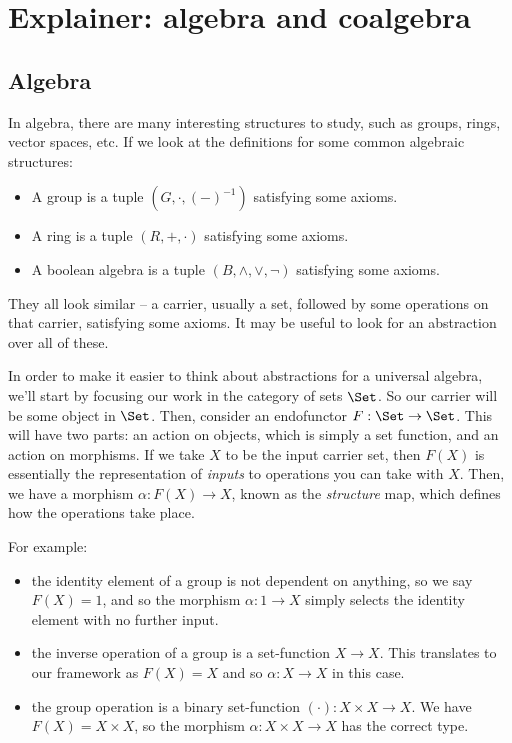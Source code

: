 \chapter{Explainer: algebra and coalgebra}

\section{Algebra}

In algebra, there are many interesting structures to study, such as groups, rings, vector spaces, etc.
If we look at the definitions for some common algebraic structures:

\begin{itemize}
    \item A group is a tuple $(G, \cdot, (-)^{-1})$ satisfying some axioms.
    \item A ring is a tuple $(R, +, \cdot)$ satisfying some axioms.
    \item A boolean algebra is a tuple $(B, \land, \lor, \neg)$ satisfying some axioms.
\end{itemize}

They all look similar -- a carrier, usually a set, followed by some operations on that carrier, satisfying some axioms.
It may be useful to look for an abstraction over all of these.

In order to make it easier to think about abstractions for a universal algebra, we'll start by focusing our work in the category of sets $\Set$.
So our carrier will be some object in $\Set$.
Then, consider an endofunctor $F : \Set \rightarrow \Set$.
This will have two parts: an action on objects, which is simply a set function, and an action on morphisms.
If we take $X$ to be the input carrier set, then $F(X)$ is essentially the representation of \emph{inputs} to operations you can take with $X$.
Then, we have a morphism $\alpha : F(X) \rightarrow X$, known as the \emph{structure} map, which defines how the operations take place.

For example:
\begin{itemize}
    \item the identity element of a group is not dependent on anything, so we say $F(X) = 1$, and so the morphism $\alpha : 1 \rightarrow X$ simply selects the identity element with no further input.
    \item the inverse operation of a group is a set-function $X \rightarrow X$. This translates to our framework as $F(X) = X$ and so $\alpha : X \rightarrow X$ in this case.
    \item the group operation is a binary set-function $(\cdot) : X \times X \rightarrow X$. We have $F(X) = X \times X$, so the morphism $\alpha : X \times X \rightarrow X$ has the correct type.
\end{itemize}

